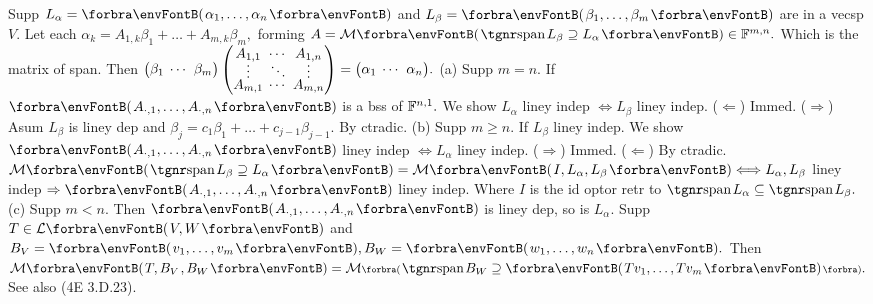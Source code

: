 
\vspace{8pt}

\BulletPointX\NoteFor{[3.30, 32]}\;\TextB{}
Supp $L_{\alpha}=\Par{\alpha_1,\dots,\alpha_n}$ and $L_{\beta}=\Par{\beta_1,\dots,\beta_m}$ are in a vecsp $V.$\TextB{}
Let each $\alpha_k=A_{1,k}\beta_1+\dots+A_{m,k}\beta_m,$ forming $A=\Mt{\spn L_\beta\supseteq L_{\alpha}}\in\Fbb^{m,n}.$\TextB{\vspace{3pt}}
Which is {\tgsl the matrix of span}. \;Then ${\normalsize\begin{pmatrix}\beta_1 &\hspace{-6pt} \cdots &\hspace{-6pt} \beta_m\end{pmatrix}\begin{pmatrix}
	A_{1,1} &\hspace{-6pt} \cdots &\hspace{-6pt} A_{1,n}\\[-4pt]
	\vdots	&\hspace{-6pt} \ddots &\hspace{-6pt} \vdots \\[-4pt]
	A_{m,1} &\hspace{-6pt} \cdots &\hspace{-6pt} A_{m,n}
\end{pmatrix}}={\normalsize\begin{pmatrix}\alpha_1 &\hspace{-6pt} \cdots &\hspace{-6pt} \alpha_n\end{pmatrix}}.$\TextB{\vspace{6pt}}
(a) Supp $m=n.$ If $\Par{A_{\cdot,1},\dots,A_{\cdot,n}}$ is a bss of ${\mathbb{F}}^{n,1}.$ We show $L_{\alpha}$ liney indep $\Longleftrightarrow L_{\beta}$ liney indep.\TextB{}
\Ha ($\Leftarrow$) Immed. ($\Rightarrow$) Asum $L_{\beta}$ is liney dep and $\beta_j=c_1\beta_1+\dots+c_{j-1}\beta_{j-1}.$ By ctradic.\PfEnd\vspace{2pt}\TextB{}
(b) Supp $m\geqslant n.$ If $L_{\beta}$ liney indep. We show $\Par{A_{\cdot,1},\dots,A_{\cdot,n}}$ liney indep $\Longleftrightarrow L_{\alpha}$ liney indep.\TextB{}
\Hb ($\Rightarrow$) Immed. ($\Leftarrow$) By ctradic.\PfEnd\TextB{}
\Hb\ANote $\Mt{\spn L_{\beta}\supseteq L_\alpha}=\Mt{I,L_{\alpha},L_{\beta}}\Longleftrightarrow L_{\alpha},L_{\beta}$ liney indep $\Rightarrow\Par{A_{\cdot,1},\dots,A_{\cdot,n}}$ liney indep.\parNot{\Hb\IndentB}
Where $I$ is the id optor retr to $\spn L_{\alpha}\subseteq\spn L_{\beta}.$
\vspace{3pt}\TextB{}
(c) Supp $m<n.$ Then $\Par{A_{\cdot,1},\dots,A_{\cdot,n}}$ is liney dep, so is $L_{\alpha}.$\TextB{\vspace{5pt}}
Supp $T\in\Lm{V,W}$ and $B_V=\Par{v_1,\dots,v_m},B_W=\Par{w_1,\dots,w_n}.$\TextB{}
Then $\Mt{T,B_V\hspace{1pt},B_W}=\Mt[\BigPar]{\spn B_W\supseteq\Par{Tv_1,\dots,Tv_m}}.$ \;See also (4E 3.D.23).
\SepLine


